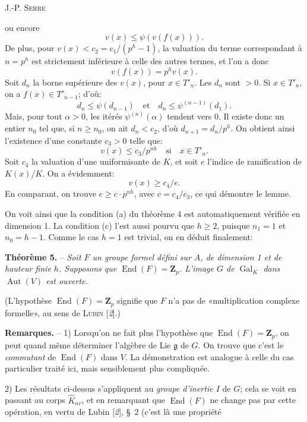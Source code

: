 \begin{center}\small J.-P. \textsc{Serre}\end{center}
ou encore
\[
v(x)\leqslant\psi(v(f(x))).
\]
De plus, pour $v(x)<c_2=c_1/(p^h-1)$, la valuation du terme correspondant à $n=p^h$ est strictement inférieure à celle des autres termes, et l’on a donc
\[
v(f(x))=p^h v(x).
\]
Soit $d_n$ la borne supérieure des $v(x)$, pour $x\in T'_n$. Les $d_n$ sont $>0$. Si $x\in T'_n$, on a $f(x)\in T'_{n-1}$; d’où:
\[
d_n\leqslant\psi(d_{n-1})\quad\text{et}\quad d_n\leqslant\psi^{(n-1)}(d_1).
\]
Mais, pour tout $\alpha>0$, les itérés $\psi^{(n)}(\alpha)$ tendent vers $0$. Il existe donc un entier $n_0$ tel que, si $n\geqslant n_0$, on ait $d_n<c_2$, d’où $d_{n+1}=d_n/p^h$. On obtient ainsi l’existence d’une constante $c_3>0$ telle que:
\[
v(x)\leqslant c_3/p^{nh}\quad\text{si}\quad x\in T'_n.
\]
Soit $c_4$ la valuation d’une uniformisante de $K$, et soit $e$ l’indice de ramification de $K(x)/K$. On a évidemment:
\[
v(x)\geqslant c_4/e.
\]
En comparant, on trouve $e\geqslant c\cdot p^{nh}$, avec $c=c_4/c_3$, ce qui démontre le lemme.

On voit ainsi que la condition (a) du théorème 4 est automatiquement vérifiée en dimension 1. La condition (c) l’est aussi pourvu que $h\geqslant 2$, puisque $n_1=1$ et $n_0=h-1$. Comme le cas $h=1$ est trivial, on en déduit finalement:

\textbf{Théorème 5.} -- \textit{Soit $F$ un groupe formel défini sur $A$, de dimension 1 et de hauteur finie $h$. Supposons que $\operatorname{End}(F)=\mathbf{Z}_p$. L’image $G$ de $\operatorname{Gal}_K$ dans $\operatorname{Aut}(V)$ est ouverte.}

(L’hypothèse $\operatorname{End}(F)=\mathbf{Z}_p$ signifie que $F$ n’a pas de «multiplication complexe formelle», au sens de \textsc{Lubin} [\textit{2}].)

\textbf{Remarques.} -- 1) Lorsqu’on ne fait plus l’hypothèse que $\operatorname{End}(F)=\mathbf{Z}_p$, on peut quand même déterminer l’algèbre de Lie $\mathfrak{g}$ de $G$. On trouve que c’est le \textit{commutant} de $\operatorname{End}(F)$ dans $V$. La démonstration est analogue à celle du cas particulier traité ici, mais sensiblement plus compliquée.%

2) Les résultats ci-dessus s’appliquent au \textit{groupe d’inertie $I$} de $G$; cela se voit en passant au corps $\hat K_{nr}$, et en remarquant que $\operatorname{End}(F)$ ne change pas par cette opération, en vertu de Lubin [\textit{2}], \S~2 (c’est là une propriété
